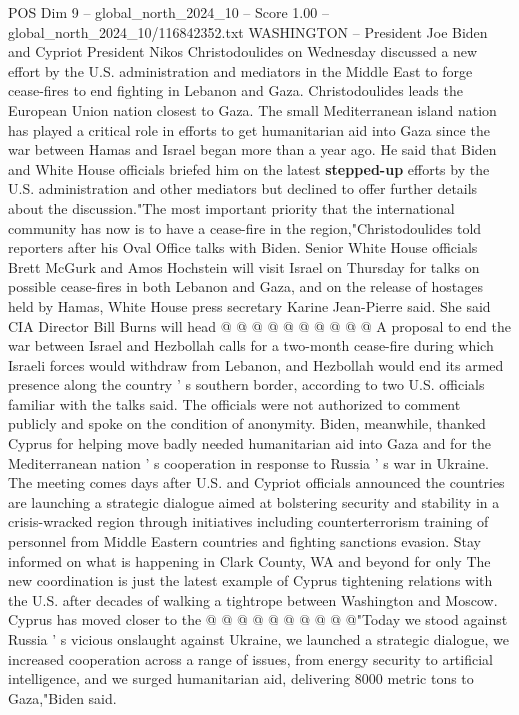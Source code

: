 \begin{textsample}{POS Dim 9 – global\_north\_2024\_10 – Score 1.00 – global\_north\_2024\_10/116842352.txt}  \label{ex:f9_pos_398}
WASHINGTON -- President Joe Biden and Cypriot President Nikos Christodoulides on Wednesday discussed a new effort by the U.S. administration and mediators in the Middle East to forge cease-fires to end fighting in Lebanon and Gaza.
Christodoulides leads the European Union nation closest to Gaza.
The small Mediterranean island nation has played a critical role in efforts to get humanitarian aid into Gaza since the war between Hamas and Israel began more than a year ago.
He said that Biden and White House officials briefed him on the latest \textbf{stepped-up} efforts by the U.S. administration and other mediators but declined to offer further details about the discussion."The most important priority that the international community has now is to have a cease-fire in the region,"Christodoulides told reporters after his Oval Office talks with Biden.
Senior White House officials Brett McGurk and Amos Hochstein will visit Israel on Thursday for talks on possible cease-fires in both Lebanon and Gaza, and on the release of hostages held by Hamas, White House press secretary Karine Jean-Pierre said.
She said CIA Director Bill Burns will head @ @ @ @ @ @ @ @ @ @ A proposal to end the war between Israel and Hezbollah calls for a two-month cease-fire during which Israeli forces would withdraw from Lebanon, and Hezbollah would end its armed presence along the country ' s southern border, according to two U.S. officials familiar with the talks said.
The officials were not authorized to comment publicly and spoke on the condition of anonymity.
Biden, meanwhile, thanked Cyprus for helping move badly needed humanitarian aid into Gaza and for the Mediterranean nation ' s cooperation in response to Russia ' s war in Ukraine.
The meeting comes days after U.S. and Cypriot officials announced the countries are launching a strategic dialogue aimed at bolstering security and stability in a crisis-wracked region through initiatives including counterterrorism training of personnel from Middle Eastern countries and fighting sanctions evasion.
Stay informed on what is happening in Clark County, WA and beyond for only The new coordination is just the latest example of Cyprus tightening relations with the U.S. after decades of walking a tightrope between Washington and Moscow.
Cyprus has moved closer to the @ @ @ @ @ @ @ @ @ @"Today we stood against Russia ' s vicious onslaught against Ukraine, we launched a strategic dialogue, we increased cooperation across a range of issues, from energy security to artificial intelligence, and we surged humanitarian aid, delivering 8000 metric tons to Gaza,"Biden said.

\end{textsample}
